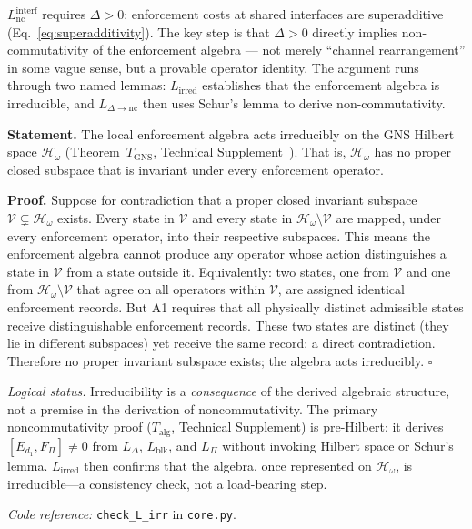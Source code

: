 \documentclass[11pt]{article}
\newcommand{\coderef}[2]{\smallskip\noindent\textit{Code reference:} \texttt{#1} in \texttt{#2}.}
\begin{document}
$L_{\mathrm{nc}}^{\mathrm{interf}}$ requires $\Delta > 0$: enforcement costs at shared interfaces are superadditive (Eq.~\ref{eq:superadditivity}).  The key step is that $\Delta > 0$ directly implies non-commutativity of the enforcement algebra --- not merely ``channel rearrangement'' in some vague sense, but a provable operator identity.  The argument runs through two named lemmas: $L_{\mathrm{irred}}$ establishes that the enforcement algebra is irreducible, and $L_{\Delta\to\mathrm{nc}}$ then uses Schur's lemma to derive non-commutativity.

\begin{tcolorbox}[apfbox, title={Lemma $L_{\mathrm{irred}}$ (Irreducibility of the Derived Algebra)}]
\textbf{Statement.}  The local enforcement algebra acts irreducibly on the GNS Hilbert space $\mathcal{H}_\omega$ (Theorem~$T_{\mathrm{GNS}}$, Technical Supplement~\cite{BrookeSupplement}).  That is, $\mathcal{H}_\omega$ has no proper closed subspace that is invariant under every enforcement operator.

\smallskip\noindent\textbf{Proof.}  Suppose for contradiction that a proper closed invariant subspace $\mathcal{V} \subsetneq \mathcal{H}_\omega$ exists.  Every state in $\mathcal{V}$ and every state in $\mathcal{H}_\omega \setminus \mathcal{V}$ are mapped, under every enforcement operator, into their respective subspaces.  This means the enforcement algebra cannot produce any operator whose action distinguishes a state in $\mathcal{V}$ from a state outside it.  Equivalently: two states, one from $\mathcal{V}$ and one from $\mathcal{H}_\omega \setminus \mathcal{V}$ that agree on all operators within $\mathcal{V}$, are assigned identical enforcement records.  But A1 requires that all physically distinct admissible states receive distinguishable enforcement records.  These two states are distinct (they lie in different subspaces) yet receive the same record: a direct contradiction.  Therefore no proper invariant subspace exists; the algebra acts irreducibly.  $\square$

\smallskip\noindent\textit{Logical status.}  Irreducibility is a \emph{consequence} of the derived algebraic structure, not a premise in the derivation of noncommutativity.  The primary noncommutativity proof ($T_{\mathrm{alg}}$, Technical Supplement) is pre-Hilbert: it derives $[E_{d_1}, F_\Pi] \ne 0$ from $L_\Delta$, $L_{\mathrm{blk}}$, and $L_\Pi$ without invoking Hilbert space or Schur's lemma.  $L_{\mathrm{irred}}$ then confirms that the algebra, once represented on $\mathcal{H}_\omega$, is irreducible---a consistency check, not a load-bearing step.

\coderef{check\_L\_irr}{core.py}
\end{tcolorbox}
\end{document}
